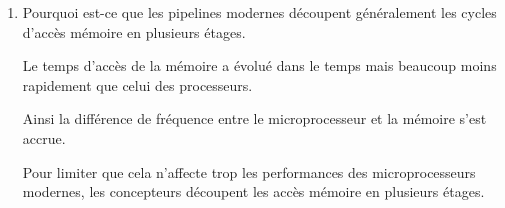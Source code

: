 \begin{enumerate}
\begin{correction}
    \end{correction}

  \item
    Pourquoi est-ce que les pipelines modernes d\'ecoupent g\'en\'eralement
    les cycles d'acc\`es m\'emoire en plusieurs \'etages.

    \begin{correction}

      Le temps d'acc\`es de la m\'emoire a \'evolu\'e dans le temps mais
      beaucoup moins rapidement que celui des processeurs.

      Ainsi la diff\'erence de fr\'equence entre le microprocesseur et
      la m\'emoire s'est accrue.

      Pour limiter que cela n'affecte trop les performances des
      microprocesseurs modernes, les concepteurs d\'ecoupent les acc\`es
      m\'emoire en plusieurs \'etages.

    \end{correction}

\end{enumerate}


